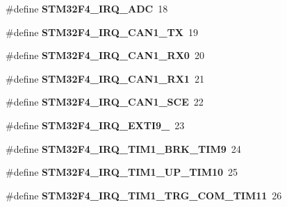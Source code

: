 \begin{DoxyCompactItemize}
\item 
\mbox{\label{group__stm32f4__interrupt_ga8f24d74a1897297f5d7b8c0aaec71eaf}} 
\#define {\bfseries S\+T\+M32\+F4\+\_\+\+I\+R\+Q\+\_\+\+A\+DC}~18
\item 
\mbox{\label{group__stm32f4__interrupt_ga25846ed755fe27b8154e911e9bf59e49}} 
\#define {\bfseries S\+T\+M32\+F4\+\_\+\+I\+R\+Q\+\_\+\+C\+A\+N1\+\_\+\+TX}~19
\item 
\mbox{\label{group__stm32f4__interrupt_gac41ad0f26d0d89c7f8ac6eff75f19ec2}} 
\#define {\bfseries S\+T\+M32\+F4\+\_\+\+I\+R\+Q\+\_\+\+C\+A\+N1\+\_\+\+R\+X0}~20
\item 
\mbox{\label{group__stm32f4__interrupt_gade672f413162ef320b4ee9be7bd1f7f3}} 
\#define {\bfseries S\+T\+M32\+F4\+\_\+\+I\+R\+Q\+\_\+\+C\+A\+N1\+\_\+\+R\+X1}~21
\item 
\mbox{\label{group__stm32f4__interrupt_gafcd0990c3e9951092341ba0c91dabaa5}} 
\#define {\bfseries S\+T\+M32\+F4\+\_\+\+I\+R\+Q\+\_\+\+C\+A\+N1\+\_\+\+S\+CE}~22
\item 
\mbox{\label{group__stm32f4__interrupt_ga605c9475b5f5b98163ca51be1ab09ddd}} 
\#define {\bfseries S\+T\+M32\+F4\+\_\+\+I\+R\+Q\+\_\+\+E\+X\+T\+I9\+\_}~23
\item 
\mbox{\label{group__stm32f4__interrupt_ga5c7646c4c433594fd2dff0428b1cc440}} 
\#define {\bfseries S\+T\+M32\+F4\+\_\+\+I\+R\+Q\+\_\+\+T\+I\+M1\+\_\+\+B\+R\+K\+\_\+\+T\+I\+M9}~24
\item 
\mbox{\label{group__stm32f4__interrupt_ga74109d860dedcf84b4957d7f5971541e}} 
\#define {\bfseries S\+T\+M32\+F4\+\_\+\+I\+R\+Q\+\_\+\+T\+I\+M1\+\_\+\+U\+P\+\_\+\+T\+I\+M10}~25
\item 
\mbox{\label{group__stm32f4__interrupt_gae71d76ea3d3d47acd6137e4c31dd91e2}} 
\#define {\bfseries S\+T\+M32\+F4\+\_\+\+I\+R\+Q\+\_\+\+T\+I\+M1\+\_\+\+T\+R\+G\+\_\+\+C\+O\+M\+\_\+\+T\+I\+M11}~26
\item 

\end{DoxyCompactItemize}
